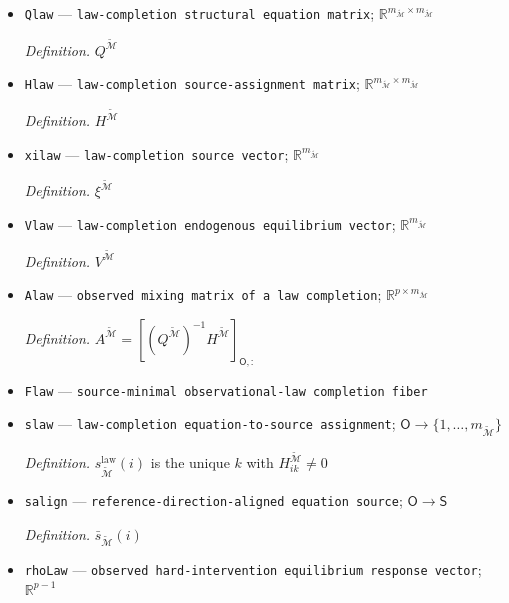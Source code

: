 \documentclass{article}
\begin{document}
\begin{itemize}
  \par\smallskip\noindent\emph{Definition.} \(m_{\widetilde{\mathcal M}}\)
  \item \texttt{Qlaw} --- \texttt{law-\allowbreak{}completion structural equation matrix}; \(\mathbb R^{m_{\widetilde{\mathcal M}}\times m_{\widetilde{\mathcal M}}}\)
  \par\smallskip\noindent\emph{Definition.} \(Q^{\widetilde{\mathcal M}}\)
  \item \texttt{Hlaw} --- \texttt{law-\allowbreak{}completion source-\allowbreak{}assignment matrix}; \(\mathbb R^{m_{\widetilde{\mathcal M}}\times m_{\widetilde{\mathcal M}}}\)
  \par\smallskip\noindent\emph{Definition.} \(H^{\widetilde{\mathcal M}}\)
  \item \texttt{xilaw} --- \texttt{law-\allowbreak{}completion source vector}; \(\mathbb R^{m_{\widetilde{\mathcal M}}}\)
  \par\smallskip\noindent\emph{Definition.} \(\xi^{\widetilde{\mathcal M}}\)
  \item \texttt{Vlaw} --- \texttt{law-\allowbreak{}completion endogenous equilibrium vector}; \(\mathbb R^{m_{\widetilde{\mathcal M}}}\)
  \par\smallskip\noindent\emph{Definition.} \(V^{\widetilde{\mathcal M}}\)
  \item \texttt{Alaw} --- \texttt{observed mixing matrix of a law completion}; \(\mathbb R^{p\times m_{\widetilde{\mathcal M}}}\)
  \par\smallskip\noindent\emph{Definition.} \(A^{\widetilde{\mathcal M}}=[(Q^{\widetilde{\mathcal M}})^{-1}H^{\widetilde{\mathcal M}}]_{\mathsf O,:}\)
  \item \texttt{Flaw} --- \texttt{source-\allowbreak{}minimal observational-\allowbreak{}law completion fiber}
  \item \texttt{slaw} --- \texttt{law-\allowbreak{}completion equation-\allowbreak{}to-\allowbreak{}source assignment}; \(\mathsf O\to\{1,\ldots,m_{\widetilde{\mathcal M}}\}\)
  \par\smallskip\noindent\emph{Definition.} \(s_{\widetilde{\mathcal M}}^{\mathrm{law}}(i)\) is the unique \(k\) with \(H^{\widetilde{\mathcal M}}_{ik}\ne0\)
  \item \texttt{salign} --- \texttt{reference-\allowbreak{}direction-\allowbreak{}aligned equation source}; \(\mathsf O\to\mathsf S\)
  \par\smallskip\noindent\emph{Definition.} \(\bar s_{\widetilde{\mathcal M}}(i)\)
  \item \texttt{rhoLaw} --- \texttt{observed hard-\allowbreak{}intervention equilibrium response vector}; \(\mathbb R^{p-1}\)

\end{itemize}
\end{document}
